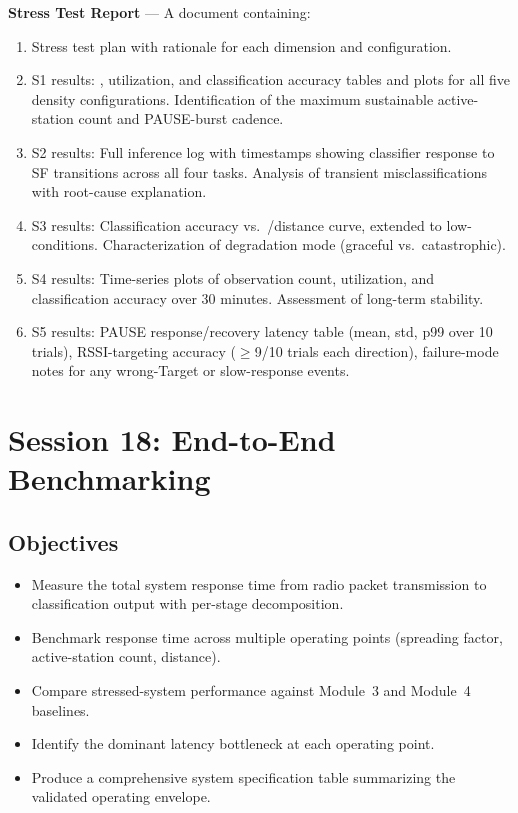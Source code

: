 \documentclass[11pt,letterpaper]{article}
\begin{document}
	\begin{tcolorbox}[deliverable={Session 17 Deliverable}]
		\textbf{Stress Test Report} --- A document containing:
		\begin{enumerate}
			\item Stress test plan with rationale for each dimension and configuration.
			\item S1 results: \PER{}, \FIFO{} utilization, and classification accuracy tables and plots for all five density configurations. Identification of the maximum sustainable active-station count and PAUSE-burst cadence.
			\item S2 results: Full inference log with timestamps showing classifier response to SF transitions across all four tasks. Analysis of transient misclassifications with root-cause explanation.
			\item S3 results: Classification accuracy vs.\ \SNR{}/distance curve, extended to low-\SNR{} conditions. Characterization of degradation mode (graceful vs.\ catastrophic).
			\item S4 results: Time-series plots of observation count, \FIFO{} utilization, and classification accuracy over 30 minutes. Assessment of long-term stability.
			\item S5 results: PAUSE response/recovery latency table (mean, std, p99 over 10 trials), RSSI-targeting accuracy ($\geq$9/10 trials each direction), failure-mode notes for any wrong-Target or slow-response events.
		\end{enumerate}
	\end{tcolorbox}

	\newpage
	\section{Session 18: End-to-End Benchmarking}
	\label{sec:benchmark}

	\subsection{Objectives}

	\begin{itemize}[leftmargin=2em]
		\item Measure the total system response time from radio packet transmission to classification output with per-stage decomposition.
		\item Benchmark response time across multiple operating points (spreading factor, active-station count, distance).
		\item Compare stressed-system performance against Module~3 and Module~4 baselines.
		\item Identify the dominant latency bottleneck at each operating point.
		\item Produce a comprehensive system specification table summarizing the validated operating envelope.
	\end{itemize}
\end{document}
